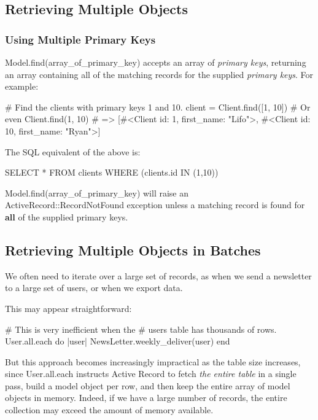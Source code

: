 \documentclass[10pt]{book}
\newenvironment{code}{%
  \scriptsize
    \verbatim
}{%
    \endverbatim
    \newline
}
\begin{document}
\subsection{ Retrieving Multiple Objects}

\subsubsection{ Using Multiple Primary Keys}

Model.find(array\_of\_primary\_key) accepts an array of \emph{primary keys}, returning an array containing all of the matching records for the supplied \emph{primary keys}. For example:
\begin{code}
# Find the clients with primary keys 1 and 10.
client = Client.find([1, 10]) # Or even Client.find(1, 10)
# => [#<Client id: 1, first_name: "Lifo">, 
      #<Client id: 10, first_name: "Ryan">]
\end{code}

The SQL equivalent of the above is:
\begin{code}
SELECT * FROM clients WHERE (clients.id IN (1,10))
\end{code}

Model.find(array\_of\_primary\_key) will raise an \\ ActiveRecord::RecordNotFound exception unless a matching record is found for \textbf{all} of the supplied primary keys.

\subsection{ Retrieving Multiple Objects in Batches}

We often need to iterate over a large set of records, as when we send  a newsletter to a large set of users, or when we export data.

This may appear straightforward:
\begin{code}
# This is very inefficient when the 
# users table has thousands of rows.
User.all.each do |user|
  NewsLetter.weekly_deliver(user)
end
\end{code}

But this approach becomes increasingly impractical as the table size increases, since User.all.each instructs Active Record to fetch \emph{the entire table}  in a single pass, build a model object per row, and then keep the  entire array of model objects in memory. Indeed, if we have a large  number of records, the entire collection may exceed the amount of memory  available.
\end{document}

